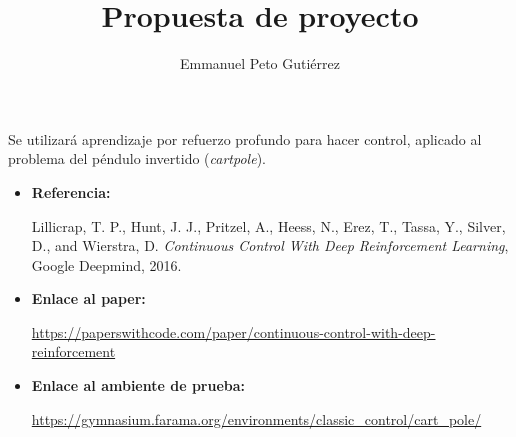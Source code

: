 \documentclass{article}
\title{Propuesta de proyecto}
\author{Emmanuel Peto Gutiérrez}
\begin{document}
\maketitle

Se utilizará aprendizaje por refuerzo profundo para hacer control, aplicado al problema del péndulo invertido (\textit{cartpole}).

\begin{itemize}

\item \textbf{Referencia:}

Lillicrap, T. P., Hunt, J. J., Pritzel, A., Heess, N., Erez, T., Tassa, Y., Silver, D., and Wierstra, D. \textit{Continuous Control With Deep Reinforcement Learning}, Google Deepmind, 2016.

\item \textbf{Enlace al paper:}

\url{https://paperswithcode.com/paper/continuous-control-with-deep-reinforcement}

\item \textbf{Enlace al ambiente de prueba:}

\url{https://gymnasium.farama.org/environments/classic_control/cart_pole/}

\end{itemize}
\end{document}
